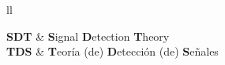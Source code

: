 \documentclass[
11pt, %
spanish, %
singlespacing, %
headsepline, %
]{MastersDoctoralThesis} %
\begin{document}
\listoffigures %

\listoftables %


\begin{abbreviations}{ll} %

\textbf{SDT} & \textbf{S}ignal \textbf{D}etection \textbf{T}heory\\
\textbf{TDS} & \textbf{T}eoría (de) \textbf{D}etección (de) \textbf{S}eñales\\

\end{abbreviations}









\end{document}
